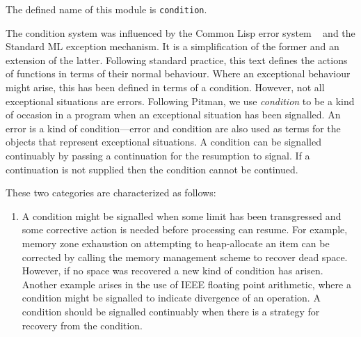 \label{condition}
\gdef\module{condition}
%
\begin{optDefinition}
The defined name of this module is {\tt condition}.

The condition system was influenced by the Common Lisp error system
~  and the Standard
ML exception mechanism.  It is a simplification of
the former and an extension of the latter.  Following standard practice, this
text defines the actions of functions in terms of their normal behaviour.  Where
an exceptional behaviour might arise, this has been defined in terms of a
condition.  However, not all exceptional situations are errors.  Following
Pitman, we use {\em condition}  to be a kind of
occasion in a program when an exceptional situation has been signalled.  An
error is a kind of condition---error and condition are also used as terms for
the objects that represent exceptional situations.  A condition can be signalled
continuably by passing a continuation for the resumption to signal.  If a
continuation is not supplied then the condition cannot be continued.

\noindent
These two categories are characterized as follows:
\begin{enumerate}
    \item {} A condition might be signalled
    when some limit has been transgressed and some corrective action is needed
    before processing can resume.  For example, memory zone exhaustion on
    attempting to heap-allocate an item can be corrected by calling the memory
    management scheme to recover dead space.  However, if no space was recovered
    a new kind of condition has arisen.  Another example arises in the use of
    IEEE floating point arithmetic, where a condition might be signalled to
    indicate divergence of an operation.  A condition should be signalled
    continuably when there is a strategy for recovery from the condition.


\end{enumerate}
\end{optDefinition}
